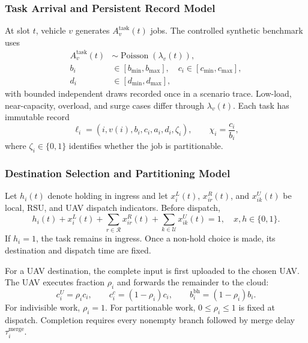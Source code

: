 \subsubsection{Task Arrival and Persistent Record Model}
At slot $t$, vehicle $v$ generates $A_v^{\mathrm{task}}(t)$ jobs. The
controlled synthetic benchmark uses
\begin{equation}
\begin{aligned}
A_v^{\mathrm{task}}(t)&\sim
\operatorname{Poisson}(\lambda_v(t)),\\
b_i&\in[b_{\min},b_{\max}],\quad
c_i\in[c_{\min},c_{\max}],\\
d_i&\in[d_{\min},d_{\max}],
\end{aligned}
\label{eq:task_arrival}
\end{equation}
with bounded independent draws recorded once in a scenario trace.
Low-load, near-capacity, overload, and surge cases differ through
$\lambda_v(t)$. Each task has immutable record
\begin{equation}
\ell_i=(i,v(i),b_i,c_i,a_i,d_i,\zeta_i),\qquad
\chi_i=\frac{c_i}{b_i},
\label{eq:task_record}
\end{equation}
where $\zeta_i\in\{0,1\}$ identifies whether the job is partitionable.

\subsubsection{Destination Selection and Partitioning Model}
Let $h_i(t)$ denote holding in ingress and let $x_i^L(t)$,
$x_{ir}^R(t)$, and $x_{ik}^U(t)$ be local, RSU, and UAV dispatch
indicators. Before dispatch,
\begin{equation}
h_i(t)+x_i^L(t)+\sum_{r\in\mathcal R}x_{ir}^R(t)
 +\sum_{k\in\mathcal U}x_{ik}^U(t)=1,
\quad x,h\in\{0,1\}.
\label{eq:destination}
\end{equation}
If $h_i=1$, the task remains in ingress. Once a non-hold choice is
made, its destination and dispatch time are fixed.

For a UAV destination, the complete input is first uploaded to the
chosen UAV. The UAV executes fraction $\rho_i$ and forwards the
remainder to the cloud:
\begin{equation}
c_i^U=\rho_i c_i,\qquad
c_i^c=(1-\rho_i)c_i,\qquad
b_i^{\mathrm{bh}}=(1-\rho_i)b_i.
\label{eq:split}
\end{equation}
For indivisible work, $\rho_i=1$. For partitionable work,
$0\le\rho_i\le1$ is fixed at dispatch. Completion requires every
nonempty branch followed by merge delay $\tau_i^{\mathrm{merge}}$.

